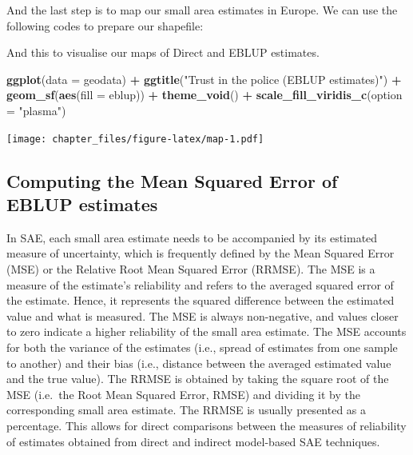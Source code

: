 \documentclass[
]{article}
\newenvironment{Shaded}{\begin{snugshade}}{\end{snugshade}}
\newcommand{\DataTypeTok}[1]{\textcolor[rgb]{0.13,0.29,0.53}{#1}}
\newcommand{\KeywordTok}[1]{\textcolor[rgb]{0.13,0.29,0.53}{\textbf{#1}}}
\newcommand{\NormalTok}[1]{#1}
\newcommand{\OperatorTok}[1]{\textcolor[rgb]{0.81,0.36,0.00}{\textbf{#1}}}
\newcommand{\StringTok}[1]{\textcolor[rgb]{0.31,0.60,0.02}{#1}}
\begin{document}
And the last step is to map our small area estimates in Europe. We can
use the following codes to prepare our shapefile:

\begin{Shaded}
\end{Shaded}

And this to visualise our maps of Direct and EBLUP estimates.

\begin{Shaded}
\begin{Highlighting}[]
\KeywordTok{ggplot}\NormalTok{(}\DataTypeTok{data =}\NormalTok{ geodata) }\OperatorTok{+}\StringTok{ }
\StringTok{  }\KeywordTok{ggtitle}\NormalTok{(}\StringTok{"Trust in the police (EBLUP estimates)"}\NormalTok{) }\OperatorTok{+}
\StringTok{  }\KeywordTok{geom_sf}\NormalTok{(}\KeywordTok{aes}\NormalTok{(}\DataTypeTok{fill =}\NormalTok{ eblup)) }\OperatorTok{+}
\StringTok{  }\KeywordTok{theme_void}\NormalTok{() }\OperatorTok{+}
\StringTok{  }\KeywordTok{scale_fill_viridis_c}\NormalTok{(}\DataTypeTok{option =} \StringTok{"plasma"}\NormalTok{)}
\end{Highlighting}
\end{Shaded}

\texttt{[image: chapter\_files/figure-latex/map-1.pdf]}

\hypertarget{computing-the-mean-squared-error-of-eblup-estimates}{%
\subsection{Computing the Mean Squared Error of EBLUP
estimates}\label{computing-the-mean-squared-error-of-eblup-estimates}}

In SAE, each small area estimate needs to be accompanied by its
estimated measure of uncertainty, which is frequently defined by the
Mean Squared Error (MSE) or the Relative Root Mean Squared Error
(RRMSE). The MSE is a measure of the estimate's reliability and refers
to the averaged squared error of the estimate. Hence, it represents the
squared difference between the estimated value and what is measured. The
MSE is always non-negative, and values closer to zero indicate a higher
reliability of the small area estimate. The MSE accounts for both the
variance of the estimates (i.e., spread of estimates from one sample to
another) and their bias (i.e., distance between the averaged estimated
value and the true value). The RRMSE is obtained by taking the square
root of the MSE (i.e.~the Root Mean Squared Error, RMSE) and dividing it
by the corresponding small area estimate. The RRMSE is usually presented
as a percentage. This allows for direct comparisons between the measures
of reliability of estimates obtained from direct and indirect
model-based SAE techniques.
\end{document}
